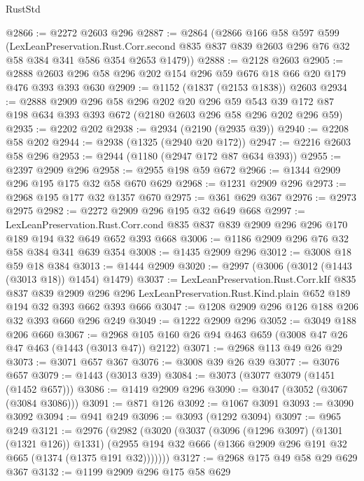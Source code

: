 \begin{lexlean}{RustStd}
\begin{coremodule}
{\begin{coremodule}
{{{{{{{{{@2866 := @2272 @2603 @296
@2887 := @2864
    (@2866
      @166
      @58
      @597
      @599
      (LexLeanPreservation.Rust.Corr.second
        @835
        @837
        @839
        @2603
        @296
        @76
        @32
        @58
        @384
        @341
        @586
        @354
        @2653
        @1479))
@2888 := @2128 @2603
@2905 := @2888 @2603 @296 @58 @296 @202 @154 @296 @59 @676 @18 @66 @20 @179 @476 @393 @393 @630
@2909 := @1152 (@1837 (@2153 @1838)) @2603
@2934 := @2888
    @2909
    @296
    @58
    @296
    @202
    @20
    @296
    @59
    @543
    @39
    @172
    @87
    @198
    @634
    @393
    @393
    @672
    (@2180 @2603 @296 @58 @296 @202 @296 @59)
@2935 := @2202 @202
@2938 := @2934 (@2190 (@2935 @39))
@2940 := @2208 @58 @202
@2944 := @2938 (@1325 (@2940 @20 @172))
@2947 := @2216 @2603 @58 @296
@2953 := @2944 (@1180 (@2947 @172 @87 @634 @393))
@2955 := @2397 @2909 @296
@2958 := @2955 @198 @59 @672
@2966 := @1344 @2909 @296 @195 @175 @32 @58 @670 @629
@2968 := @1231 @2909 @296
@2973 := @2968 @195 @177 @32 @1357 @670
@2975 := @361 @629 @367
@2976 := @2973 @2975
@2982 := @2272 @2909 @296 @195 @32 @649 @668
@2997 := LexLeanPreservation.Rust.Corr.cond
    @835
    @837
    @839
    @2909
    @296
    @296
    @170
    @189
    @194
    @32
    @649
    @652
    @393
    @668
@3006 := @1186 @2909 @296 @76 @32 @58 @384 @341 @639 @354
@3008 := @1435 @2909 @296
@3012 := @3008 @18 @59 @18 @384
@3013 := @1444 @2909
@3020 := @2997 (@3006 (@3012 (@1443 (@3013 @18)) @1454) @1479)
@3037 := LexLeanPreservation.Rust.Corr.kIf
    @835
    @837
    @839
    @2909
    @296
    @296
    LexLeanPreservation.Rust.Kind.plain
    @652
    @189
    @194
    @32
    @393
    @662
    @393
    @666
@3047 := @1208 @2909 @296 @126 @188 @206 @32 @393 @660 @296 @249
@3049 := @1222 @2909 @296
@3052 := @3049 @188 @206 @660
@3067 := @2968 @105 @160 @26 @94 @463 @659 (@3008 @47 @26 @47 @463 (@1443 (@3013 @47)) @2122)
@3071 := @2968 @113 @49 @26 @29
@3073 := @3071 @657 @367
@3076 := @3008 @39 @26 @39
@3077 := @3076 @657
@3079 := @1443 (@3013 @39)
@3084 := @3073 (@3077 @3079 (@1451 (@1452 @657)))
@3086 := @1419 @2909 @296
@3090 := @3047 (@3052 (@3067 (@3084 @3086)))
@3091 := @871 @126
@3092 := @1067 @3091
@3093 := @3090 @3092
@3094 := @941 @249
@3096 := @3093 (@1292 @3094)
@3097 := @965 @249
@3121 := @2976
    (@2982
      (@3020
        (@3037
          (@3096 (@1296 @3097) (@1301 (@1321 @126)) @1331)
          (@2955 @194 @32 @666 (@1366 @2909 @296 @191 @32 @665 (@1374 (@1375 @191 @32)))))))
@3127 := @2968 @175 @49 @58 @29 @629 @367
@3132 := @1199 @2909 @296 @175 @58 @629
}}}}}}}}}
\end{coremodule}}
\end{coremodule}
\end{lexlean}
